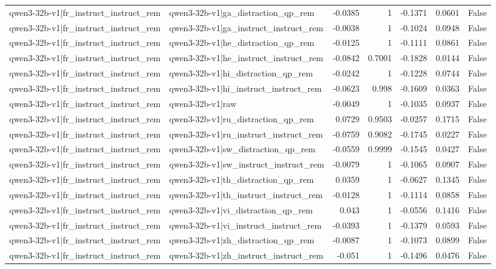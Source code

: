 \begin{table}
\begin{tabular}{l l r r r r l}
qwen3-32b-v1|fr_instruct_instruct_rem & qwen3-32b-v1|ga_distraction_qp_rem & -0.0385 & 1 & -0.1371 & 0.0601 & False \\
qwen3-32b-v1|fr_instruct_instruct_rem & qwen3-32b-v1|ga_instruct_instruct_rem & -0.0038 & 1 & -0.1024 & 0.0948 & False \\
qwen3-32b-v1|fr_instruct_instruct_rem & qwen3-32b-v1|he_distraction_qp_rem & -0.0125 & 1 & -0.1111 & 0.0861 & False \\
qwen3-32b-v1|fr_instruct_instruct_rem & qwen3-32b-v1|he_instruct_instruct_rem & -0.0842 & 0.7001 & -0.1828 & 0.0144 & False \\
qwen3-32b-v1|fr_instruct_instruct_rem & qwen3-32b-v1|hi_distraction_qp_rem & -0.0242 & 1 & -0.1228 & 0.0744 & False \\
qwen3-32b-v1|fr_instruct_instruct_rem & qwen3-32b-v1|hi_instruct_instruct_rem & -0.0623 & 0.998 & -0.1609 & 0.0363 & False \\
qwen3-32b-v1|fr_instruct_instruct_rem & qwen3-32b-v1|raw & -0.0049 & 1 & -0.1035 & 0.0937 & False \\
qwen3-32b-v1|fr_instruct_instruct_rem & qwen3-32b-v1|ru_distraction_qp_rem & 0.0729 & 0.9503 & -0.0257 & 0.1715 & False \\
qwen3-32b-v1|fr_instruct_instruct_rem & qwen3-32b-v1|ru_instruct_instruct_rem & -0.0759 & 0.9082 & -0.1745 & 0.0227 & False \\
qwen3-32b-v1|fr_instruct_instruct_rem & qwen3-32b-v1|sw_distraction_qp_rem & -0.0559 & 0.9999 & -0.1545 & 0.0427 & False \\
qwen3-32b-v1|fr_instruct_instruct_rem & qwen3-32b-v1|sw_instruct_instruct_rem & -0.0079 & 1 & -0.1065 & 0.0907 & False \\
qwen3-32b-v1|fr_instruct_instruct_rem & qwen3-32b-v1|th_distraction_qp_rem & 0.0359 & 1 & -0.0627 & 0.1345 & False \\
qwen3-32b-v1|fr_instruct_instruct_rem & qwen3-32b-v1|th_instruct_instruct_rem & -0.0128 & 1 & -0.1114 & 0.0858 & False \\
qwen3-32b-v1|fr_instruct_instruct_rem & qwen3-32b-v1|vi_distraction_qp_rem & 0.043 & 1 & -0.0556 & 0.1416 & False \\
qwen3-32b-v1|fr_instruct_instruct_rem & qwen3-32b-v1|vi_instruct_instruct_rem & -0.0393 & 1 & -0.1379 & 0.0593 & False \\
qwen3-32b-v1|fr_instruct_instruct_rem & qwen3-32b-v1|zh_distraction_qp_rem & -0.0087 & 1 & -0.1073 & 0.0899 & False \\
qwen3-32b-v1|fr_instruct_instruct_rem & qwen3-32b-v1|zh_instruct_instruct_rem & -0.051 & 1 & -0.1496 & 0.0476 & False \\

\end{tabular}
\end{table}
